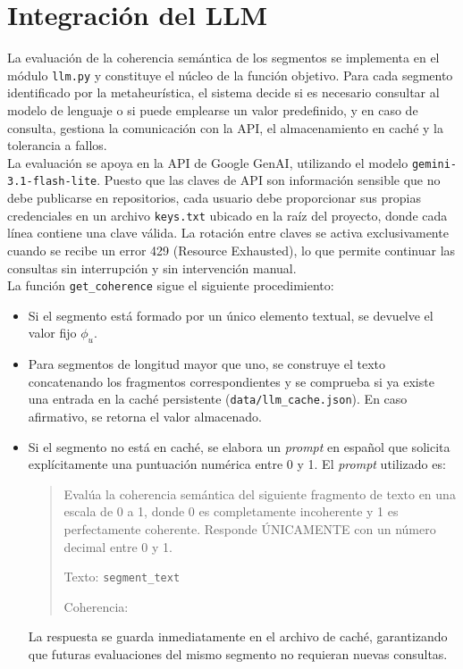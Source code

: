 \documentclass[letterpaper, 12pt]{report}
\begin{document}
\section{Integración del LLM}

La evaluación de la coherencia semántica de los segmentos se implementa en el módulo \texttt{llm.py} y constituye el núcleo de la función objetivo. 
Para cada segmento identificado por la metaheurística, el sistema decide si es necesario consultar al modelo de lenguaje o si puede emplearse un valor predefinido, y en caso de consulta, gestiona la comunicación con la API, el almacenamiento en caché y la tolerancia a fallos. \\


La evaluación se apoya en la API de Google GenAI, utilizando el modelo \texttt{gemini-3.1-flash-lite}.
Puesto que las claves de API son información sensible que no debe publicarse en repositorios, cada usuario debe proporcionar sus propias credenciales en un archivo \texttt{keys.txt} ubicado en la raíz del proyecto, donde cada línea contiene una clave válida.
La rotación entre claves se activa exclusivamente cuando se recibe un error 429 (Resource Exhausted), lo que permite continuar las consultas sin interrupción y sin intervención manual. \\

La función \texttt{get\_coherence} sigue el siguiente procedimiento:

\begin{itemize}
    \item Si el segmento está formado por un único elemento textual, se devuelve el valor fijo $\phi_u$.
    \item Para segmentos de longitud mayor que uno, se construye el texto concatenando los fragmentos correspondientes y se comprueba si ya existe una entrada en la caché persistente (\texttt{data/llm\_cache.json}). En caso afirmativo, se retorna el valor almacenado.
        \item Si el segmento no está en caché, se elabora un \textit{prompt} en español que solicita explícitamente una puntuación numérica entre 0 y 1. El \textit{prompt} utilizado es:

    \begin{quote}
    Evalúa la coherencia semántica del siguiente fragmento de texto en una escala de 0 a 1, donde 0 es completamente incoherente y 1 es perfectamente coherente. Responde ÚNICAMENTE con un número decimal entre 0 y 1.

    Texto: \texttt{segment\_text}

    Coherencia:
    \end{quote}
    La respuesta se guarda inmediatamente en el archivo de caché, garantizando que futuras evaluaciones del mismo segmento no requieran nuevas consultas.
\end{itemize}
\end{document}
